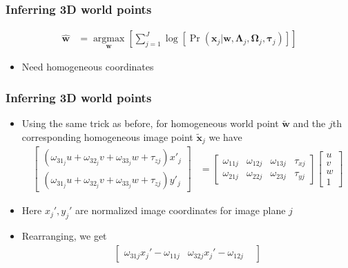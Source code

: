 \documentclass{beamer}
\begin{document}
\begin{frame}
  \frametitle{Inferring 3D world points}
  \begin{align*}
    \mathbf{\hat{w}} &=
    \underset{\mathbf{w}}
    {\operatorname{argmax}} \left[
      \sum_{j=1}^J \log{\left[
    \Pr(\mathbf{x}_j|\mathbf{w},\boldsymbol{\Lambda}_j,\boldsymbol{\Omega}_j,
    \bm{\tau}_j)
      \right]}
  \right]
  \end{align*}
  \begin{itemize}
    \item<2-> Need homogeneous coordinates
  \end{itemize}
\end{frame}

\begin{frame}
  \frametitle{Inferring 3D world points}
  \begin{itemize}[<+->]
    \item Using the same trick as before, for homogeneous world point
      $\mathbf{\tilde{w}}$ and the $j$th corresponding homogeneous image point
      $\mathbf{\tilde{x}}_j$ we have
      {\small
          \begin{align*}
          \begin{bmatrix}
            (\omega_{31}_j u+\omega_{32}_j v+\omega_{33}_j w+\tau_{zj})x'_j \\
            (\omega_{31}_j u+\omega_{32}_j v+\omega_{33}_j w+\tau_{zj})y'_j
          \end{bmatrix} &=
            \begin{bmatrix}
              \omega_{11j} & \omega_{12j} & \omega_{13j} & \tau_{xj} \\
              \omega_{21j} & \omega_{22j} & \omega_{23j} & \tau_{yj}
            \end{bmatrix}
            \begin{bmatrix}
              u \\ v \\ w \\ 1
            \end{bmatrix}
        \end{align*}
      }
    \item Here $x_j',y_j'$ are normalized image coordinates for image plane
      $j$
      \item Rearranging, we get
        {\small
        \begin{align*}
          \begin{bmatrix}
            \omega_{31j}x_j'-\omega_{11j} &
            \omega_{32j}x_j'-\omega_{12j} &

\end{bmatrix}
\end{align*}}
\end{itemize}
\end{frame}
\end{document}
